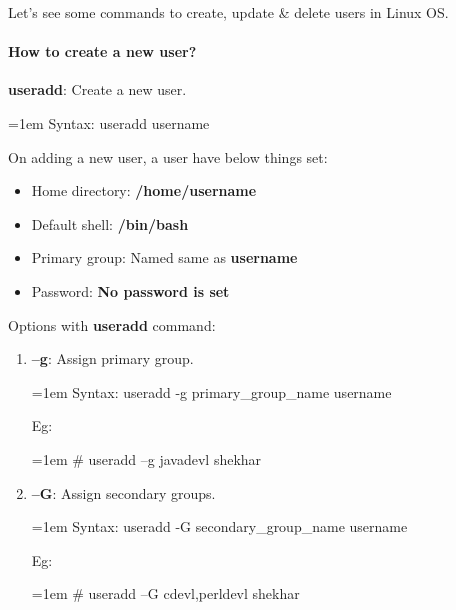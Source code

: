 \setlength{\columnsep}{3pt}
\begin{flushleft}
	
	Let's see some commands to create, update \& delete users in Linux OS.
	
	\paragraph{How to create a new user?}
	\bigskip
	\textbf{useradd}: Create a new user.
	\begin{tcolorbox}[breakable,notitle,boxrule=1pt,colback=pink,colframe=pink]
		\color{black}
		\font=1em
		Syntax:  useradd username
		\font=4pt
	\end{tcolorbox}
	On adding a new user, a user have below things set:
	\begin{itemize}
		\item Home directory: \textbf{/home/username}
		\item Default shell: \textbf{/bin/bash}
		\item Primary group: Named same as \textbf{username}
		\item Password: \textbf{No password is set}
	\end{itemize}
	
	Options with \textbf{useradd} command:
	\begin{enumerate}[label=(\alph*)]
		\item \textbf{–g}: Assign primary group.
		\bigskip
		\begin{tcolorbox}[breakable,notitle,boxrule=0pt,colback=pink,colframe=pink]
			\color{black}
			\font=1em
			Syntax: useradd -g primary\_group\_name username
			\font=4pt
		\end{tcolorbox}
		Eg:
		\bigskip
		\begin{tcolorbox}[breakable,notitle,boxrule=-0pt,colback=black,colframe=black]
			\color{green}
			\font=1em
			\# useradd –g javadevl shekhar
			\font=4pt
		\end{tcolorbox}
		
		\item \textbf{–G}: Assign secondary groups.
		\bigskip
		\begin{tcolorbox}[breakable,notitle,boxrule=0pt,colback=pink,colframe=pink]
			\color{black}
			\font=1em
			Syntax: useradd -G secondary\_group\_name username
			\font=4pt
		\end{tcolorbox}
		Eg:
		\bigskip
		\begin{tcolorbox}[breakable,notitle,boxrule=-0pt,colback=black,colframe=black]
			\color{green}
			\font=1em
			\# useradd –G cdevl,perldevl shekhar
			\font=4pt
		\end{tcolorbox}
		

\end{enumerate}
\end{flushleft}
